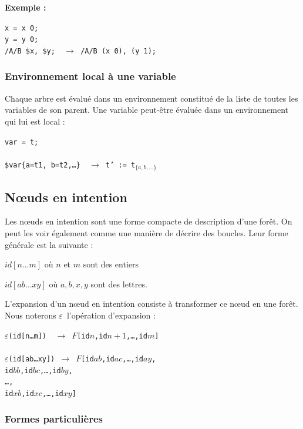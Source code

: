 \documentclass{article}
\newcommand{\exemple}	{\vspace*{1mm}\hspace*{-4mm}\textbf{Exemple :}}
\newcommand{\code}	[2][0.9]		{\vspace{0mm}\begin{center}\colorbox{mygrey}{
							\begin{minipage}[t]{#1\columnwidth} 
							{\small \texttt{#2}}
							\end{minipage}}\end{center}}
\newcommand{\foret}		{\ensuremath{F}}
\newcommand{\etc}		{…}
\newcommand{\nexpand}	{\ensuremath{\varepsilon}}
\newcommand{\ulc}		{\hspace*{37mm}}
\begin{document}
\exemple
\code{x = x 0;\\
y = y 0;\\
/A/B \$x, \$y; \ $\to$  /A/B (x 0), (y 1);}


\subsubsection{Environnement local à une variable}

Chaque arbre est évalué dans un environnement constitué de la liste de toutes les variables de son parent. Une variable peut-être évaluée dans un environnement qui lui est local :
\code{var = t;\\
\\
\$var\{a=t1, b=t2,\etc\} \ $\to$  t' := t$_{\{a, b,\etc\}}$}


\subsection{Nœuds en intention}

Les nœuds en intention sont une forme compacte de description d'une forêt. On peut les voir également comme une manière de décrire des boucles. Leur forme générale est la suivante :
\begin{description}
\item $id[n…m]$ 	où $n$ et $m$ sont des entiers
\item $id[ab…xy]$ où $a,b,x,y$ sont des lettres.
\end{description}

L'expansion d'un nœud en intention consiste à transformer ce nœud en une forêt. Nous noterons \nexpand\ l'opération d'expansion :
\code{\nexpand(id[n…m]) \ $\to$ \foret [id$n$,id$n+1$,…,id$m$]\\
\\
\nexpand(id[ab…xy]) $\to$ \foret [id$ab$,id$ac$,…,id$ay$,\\
\ulc id$bb$,id$bc$,…,id$by$,\\
\ulc …,\\
\ulc id$xb$,id$xc$,…,id$xy$]
}

\subsubsection{Formes particulières}
\end{document}
